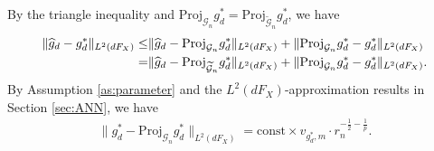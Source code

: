 \documentclass[11pt]{article}
\numberwithin{equation}{section}
\begin{document}
By the triangle inequality and $\text{Proj}_{\mathcal{G}_n}g_d^*=\text{Proj}_{\widetilde{\mathcal{G}}_n}g_d^*$, we have
\begin{align}
	\|\widehat{g}_d-g_d^*\|_{L^2(dF_X)}\leq& \|\widehat{g}_d-\text{Proj}_{\mathcal{G}_n}g_d^*\|_{L^2(dF_X)}+\|\text{Proj}_{\mathcal{G}_n}g_d^*-g_d^*\|_{L^2(dF_X)}\notag \\
	=&\|\widehat{g}_d-\text{Proj}_{\widetilde{\mathcal{G}}_n}g_d^*\|_{L^2(dF_X)}+\|\text{Proj}_{\mathcal{G}_n}g_d^*-g_d^*\|_{L^2(dF_X)}.
	\label{eq:triangle}
\end{align}
By Assumption \ref{as:parameter} and the $L^2(dF_X)$-approximation results in Section \ref{sec:ANN}, we have
\begin{align}\label{eq:app}
	\|g_d^*-\text{Proj}_{\mathcal{G}_n}g_d^*\|_{L^2(dF_X)}  = \text{const} \times v_{g_d^*,m}\cdot r_n^{-\frac{1}{2}-\frac{1}{p}} .
\end{align}
\end{document}
